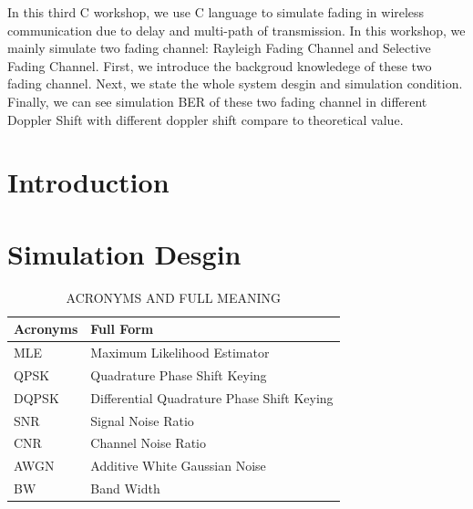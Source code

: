 \documentclass[technicalreport]{ieicej}
\begin{document}
\begin{eabstract}
In this third C workshop, we use C language to simulate fading in wireless communication due to delay and multi-path of transmission. In this workshop, we mainly simulate two fading channel: Rayleigh Fading Channel and Selective Fading Channel. First, we introduce the backgroud knowledege of these two fading channel. Next, we state the whole system desgin and simulation condition. Finally, we can see simulation BER of these two fading channel in different Doppler Shift with different doppler shift compare to theoretical value\cite{wireless_com}.
\end{eabstract}

\maketitle

\section{Introduction}


\section{Simulation Desgin}

\begin{table}[tbp]
	\begin{center}
	\caption{ACRONYMS AND FULL MEANING}
	\begin{tabular}{|l|l|}
	\hline
	\textbf{Acronyms} & \textbf{Full Form} \\
	\hline
	 MLE & Maximum Likelihood Estimator  \\ 
	 \hline
	 QPSK & Quadrature Phase Shift Keying  \\ 
	 \hline
	 DQPSK & Differential Quadrature Phase Shift Keying  \\
	 \hline
	 SNR & Signal Noise Ratio \\ 
	 \hline
	 CNR & Channel Noise Ratio  \\ 
	 \hline
	 AWGN & Additive White Gaussian Noise \\ 
	 \hline
	 BW & Band Width  \\ 
	 \hline
	\end{tabular}
	\end{center}
\end{table}
\end{document}
